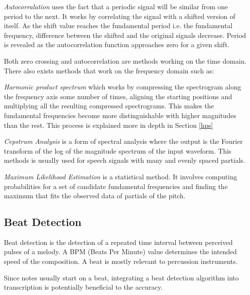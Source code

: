 \documentclass[a4paper,12pt]{report}
\begin{document}
\textit{Autocorralation} \cite{paper:3} uses the fact that a periodic signal will be similar from one period to the next. It works by correlating the signal with a shifted version of itself. As the shift value reaches the fundamental period i.e. the fundamental frequency, difference between the shifted and the original signals decrease. Period is revealed as the autocorrelation function approaches zero for a given shift.

Both zero crossing and autocorrelation are methods working on the time domain. There also exists methods that work on the frequency domain such as:

\textit{Harmonic product spectrum} which works by compressing the spectrogram along the frequency axis some number of times, aligning the starting positions and multiplying all the resulting compressed spectrograms. This makes the fundamental frequencies become more distinguishable with higher magnitudes than the rest. This process is explained more in depth in Section \ref{hps}

\textit{Cepstrum Analysis} \cite{paper:4} is a form of spectral analysis where the output is the Fourier transform of the log of the magnitude spectrum of the input waveform. This methods is usually used for speech signals with many and evenly spaced partials. 

\textit{Maximum Likelihood Estimation} \cite{paper:4, paper:5} is a statistical method. It involves computing probabilities for a set of candidate fundamental frequencies and finding the maximum that fits the observed data of partials of the pitch. 

\subsection{Beat Detection}
Beat detection is the detection of a repeated time interval between perceived pulses of a melody. A BPM (Beats Per Minute) value determines the intended speed of the composition. A beat is mostly relevant to percussion instruments.

Since notes usually start on a beat, integrating a beat detection algorithm into transcription is potentially beneficial to the accuracy.
\end{document}
